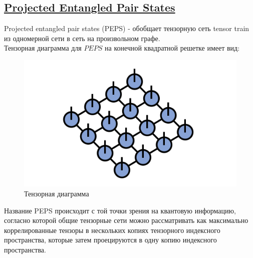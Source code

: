 \subsection{\href{https://tensornetwork.org/peps/}{Projected Entangled Pair States}}
Projected entangled pair states (PEPS) - обобщает тензорную сеть tensor train из одномерной сети в сеть на произвольном графе.\\

Тензорная диаграмма для $PEPS$ на конечной квадратной решетке имеет вид:

\begin{figure}[h!tp]
\centering
\includegraphics[scale=0.3]{PEPS/PEPS.png}
\caption{Тензорная диаграмма}
\label{fig:PEPSDiag}
\end{figure} 

Название PEPS происходит с той точки зрения на квантовую информацию, согласно которой общие тензорные сети можно рассматривать как максимально коррелированные тензоры в нескольких копиях тензорного индексного пространства, которые затем проецируются в одну копию индексного пространства.